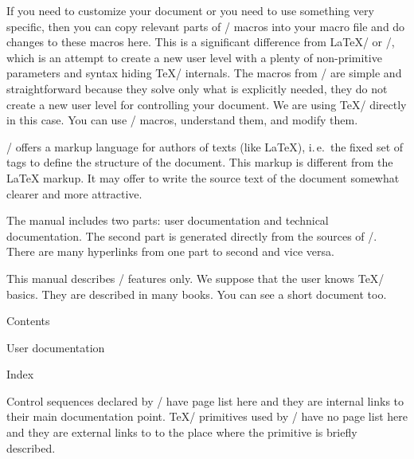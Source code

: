 If you need to customize your document or you need to use something
very specific, then you can copy relevant parts of \OpTeX/ macros into your macro
file and do changes to these macros here. This is a significant difference from
\LaTeX/ or \ConTeXt/, which is an attempt to create a new user level with a
plenty of non-primitive parameters and syntax hiding \TeX/ internals.
The macros from \OpTeX/ are simple and straightforward because they solve only
what is explicitly needed, they do not create a new user level for
controlling your document. We are using \TeX/ directly in this case.
You can use \OpTeX/ macros, understand them, and modify them.

\OpTeX/ offers a markup language for authors of texts (like \LaTeX),
i.\,e.\ the fixed set of tags to define the structure of the document. This
markup is different from the \LaTeX{} markup. It may offer to write the
source text of the document somewhat clearer and more attractive. 

The manual includes two parts: user documentation and technical
documentation. The second part is generated directly from the sources of
\OpTeX/. There are many hyperlinks from one part to second and vice versa.

This manual describes \OpTeX/ features only. We suppose that the user knows \TeX/
basics. They are described in many books. You can see a short
document  too.

\vfil\break

  

{\baselineskip=13.4pt
\notoc\nonum \sec Contents
\maketoc
\par}


\chap User documentation


\endgroup




\vfil\break

\def\_printchap#1{\noindent{\_printrefnum[@]\_secfont #1}\medskip}

\nonum\chap Index

\noindent
Control sequences declared by \OpTeX/ have page list here and they are
internal links to their main documentation point. \TeX/ primitives used by
\OpTeX/ have no page list here and they are external links to
to the place where the primitive is briefly described.

